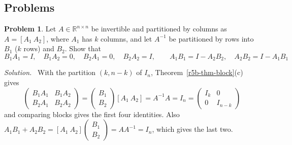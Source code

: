 \documentclass[12pt]{article}
\newcommand{\R}{\mathbb R}
\theoremstyle{definition}
\newtheorem{problem}{Problem}
\newenvironment{solution}{\par\noindent\textit{Solution.}\ }{\par\smallskip}
\begin{document}
\subsection*{Problems}

\begin{problem}\label{r5b-ex-inverse-blocks}
Let \(A\in\R^{n\times n}\) be invertible and partitioned by columns as \(A=[A_1\ A_2]\), where
\(A_1\) has \(k\) columns, and let \(A^{-1}\) be partitioned by rows into \(B_1\) (\(k\) rows)
and \(B_2\). Show that
\[
B_1A_1=I,\quad B_1A_2=0,\quad B_2A_1=0,\quad B_2A_2=I,\qquad
A_1B_1=I-A_2B_2,\quad A_2B_2=I-A_1B_1
\]
\end{problem}
\begin{solution}
With the partition \((k,n-k)\) of \(I_n\), Theorem~\ref{r5b-thm-block}(c) gives
\[
\begin{pmatrix}B_1A_1&B_1A_2\\B_2A_1&B_2A_2\end{pmatrix}
=\begin{pmatrix}B_1\\B_2\end{pmatrix}[A_1\ A_2]=A^{-1}A=I_n=\begin{pmatrix}I_k&0\\0&I_{n-k}\end{pmatrix}
\]
and comparing blocks gives the first four identities. Also
\(A_1B_1+A_2B_2=[A_1\ A_2]\left(\begin{smallmatrix}B_1\\B_2\end{smallmatrix}\right)=AA^{-1}=I_n\),
which gives the last two.
\end{solution}
\end{document}

